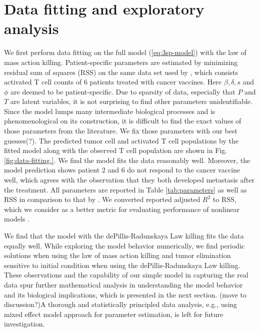 \documentclass[review,authoryear]{elsarticle}
\begin{document}
\section{Data fitting and exploratory analysis} \label{sec:data}
We first perform data fitting on the full model (\ref{eq:3sp-model}) with the law of mass action killing. Patient-specific parameters are estimated by minimizing residual sum of squares (RSS) on the same data set used by \cite{Messan2021}, which consists activated T cell counts of 6 patients treated with cancer vaccines. Here $\beta, \delta, s$ and $\phi$ are deemed to be patient-specific. Due to sparsity of data, especially that $P$ and $T$ are latent variables, it is not surprising to find other parameters unidentifiable.  Since the model lumps many intermediate biological processes and is phenomenological on its construction, it is difficult to find the exact values of those parameters from the literature. We fix those parameters with our best guesses(?). The predicted tumor cell and activated T cell populations by the fitted model along with the observed T cell population are shown in Fig. \ref{fig:data-fitting.}. We find the model fits the data reasonably well. Moreover, the model prediction shows patient 2 and 6 do not respond to the cancer vaccine well, which agrees with the observation that they both developed metastasis after the treatment. All parameters are reported in Table \ref{tab:parameters} as well as RSS in comparison to that by \cite{Messan2021}. We converted \cite{Messan2021} reported adjusted $R^2$ to RSS, which we consider as a better metric for evaluating performance of nonlinear models \citep{Spiess2010}.

We find that the model with the dePillis-Radunskaya Law killing fits the data equally well. While exploring the model behavior numerically, we find periodic solutions when using the law of mass action killing and tumor elimination sensitive to initial condition when using the dePillis-Radunskaya Law killing. These observations and the capability of our simple model in capturing the real data spur further mathematical analysis in understanding the model behavior and its biological implications, which is presented in the next section. (move to discussion?)A thorough and statistically principled data analysis, e.g., using mixed effect model approach for parameter estimation, is left for future investigation. 
\end{document}
